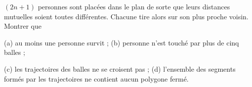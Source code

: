 $(2n + 1)$ personnes sont placées dans le plan de sorte que leurs distances mutuelles soient toutes différentes. Chacune tire alors sur son plus proche voisin. Montrer que

(a) au moins une personne survit ; (b) personne n'est touché par plus de cinq balles ;

(c) les trajectoires des balles ne se croisent pas ; (d) l'ensemble des segments formés par les trajectoires ne contient aucun polygone fermé.
